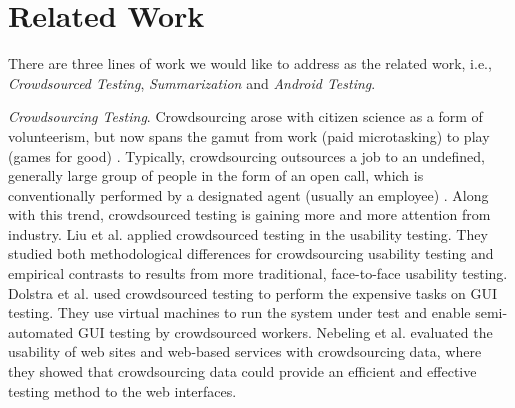 \documentclass[10pt,conference]{IEEEtran}
\begin{document}
\section{Related Work}\label{relatedwork}

There are three lines of work we would like to address as the related work, i.e., \emph{Crowdsourced Testing}, \emph{Summarization} and \emph{Android Testing}.

\emph{Crowdsourcing Testing}. Crowdsourcing arose with citizen science as a form of volunteerism, but now spans the gamut from work (paid microtasking)
to play (games for good) \cite{michelucci2016power}. Typically, crowdsourcing outsources a job to an undefined, generally large group of people
in the form of an open call, which is conventionally performed by a designated agent (usually an employee) \cite{difallah2015dynamics,estelles2012towards,conf/icse/MaoYLH04}.
Along with this trend, crowdsourced testing is gaining more and more attention from industry.
Liu et al. \cite{liu2012crowdsourcing} applied crowdsourced testing in the usability testing. They studied both methodological differences for crowdsourcing usability testing and
empirical contrasts to results from more traditional, face-to-face usability testing. 
Dolstra  et al. \cite{icst/DolstraVP13} used crowdsourced testing to perform the expensive tasks on GUI testing. They use virtual machines to run
the system under test and enable semi-automated GUI testing by crowdsourced workers. Nebeling et al. \cite{nebeling2012crowdsourced} evaluated
the usability of web sites and web-based services with crowdsourcing data, where they showed that crowdsourcing data could provide an efficient
and effective testing method to the web interfaces.
\end{document}
